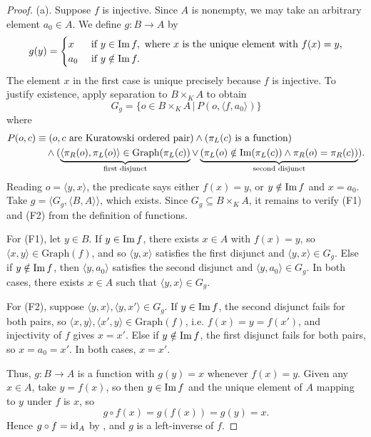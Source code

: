 \begin{proof}
	(a).
	Suppose $f$ is injective.
	Since $A$ is nonempty, we may take an arbitrary element $a_{0}\in A$.
	We define $g:B\rightarrow A$ by
	\[ g(y) = \begin{cases}
		x &\text{ if } y\in\operatorname{Im} f, \text{ where $x$ is the unique element with } f(x)=y, \\
		a_{0} &\text{ if } y\notin\operatorname{Im} f.
	\end{cases} \]
	The element $x$ in the first case is unique precisely because $f$ is injective.
	To justify existence, apply separation to $B\times_{K} A$ to obtain
	\[ G_{g} = \{ o\in B\times_{K} A \,|\, P(o, \langle f, a_{0}\rangle) \} \]
	where
	\begin{align*}
		P(o, c) &\equiv (o, c\text{ are Kuratowski ordered pair})\land (\pi_{L}(c)\text{ is a function}) \\
		&\quad\land ( \underbrace{ \langle\pi_{R}(o), \pi_{L}(o)\rangle\in\textrm{Graph}(\pi_{L}(c)) }_{\text{first disjunct}}\lor \underbrace{ (\pi_{L}(o)\notin\operatorname{Im}(\pi_{L}(c))\land \pi_{R}(o) = \pi_{R}(c)) }_{\text{second disjunct}} ).
	\end{align*}
	Reading $o = \langle y, x\rangle$, the predicate says either $f(x) = y$, or $y\notin\operatorname{Im} f$ and $x = a_{0}$.
	Take $g = \langle G_{g}, \langle B, A\rangle\rangle$, which exists.
	Since $G_{g}\subseteq B\times_{K} A$, it remains to verify (F1) and (F2) from the definition of functions.
	
	For (F1), let $y\in B$.
	If $y\in\operatorname{Im} f$, there exists $x\in A$ with $f(x) = y$, so $\langle x, y\rangle\in\textrm{Graph}(f)$, and so $\langle y, x\rangle$ satisfies the first disjunct and $\langle y, x\rangle\in G_{g}$.
	Else if $y\notin\operatorname{Im} f$, then $\langle y, a_{0}\rangle$ satisfies the second disjunct and $\langle y, a_{0}\rangle\in G_{g}$.
	In both cases, there exists $x\in A$ such that $\langle y, x\rangle\in G_{g}$.
	
	For (F2), suppose $\langle y, x\rangle, \langle y, x'\rangle\in G_{g}$.
	If $y\in\operatorname{Im} f$, the second disjunct fails for both pairs, so $\langle x, y\rangle, \langle x', y\rangle\in\textrm{Graph}(f)$, i.e. $f(x) = y = f(x')$, and injectivity of $f$ gives $x = x'$.
	Else if $y\notin\operatorname{Im} f$, the first disjunct fails for both pairs, so $x = a_{0} = x'$.
	In both cases, $x = x'$.
	
	Thus, $g:B\rightarrow A$ is a function with $g(y) = x$ whenever $f(x) = y$.
	Given any $x\in A$, take $y = f(x)$, so then $y\in\operatorname{Im} f$ and the unique element of $A$ mapping to $y$ under $f$ is $x$, so
	\[ g\circ f(x) = g(f(x)) = g(y) = x. \]
	Hence $g\circ f = \operatorname{id}_{A}$ by , and $g$ is a left-inverse of $f$.
	

\end{proof}
